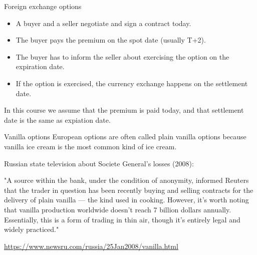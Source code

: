 \documentclass{beamer}
\begin{document}
\begin{frame}{Foreign exchange options}
\justify
\centering
{}
	
\justify
\begin{itemize}
\justifying
\item A buyer and a seller negotiate and sign a contract \alert{today}.
\item The buyer pays the premium on the \alert{spot date} (usually T+2).
\item The buyer has to inform the seller about exercising the option on the \alert{expiration date}.
\item If the option is exercised, the currency exchange happens on the \alert{settlement date}.
\end{itemize}

\justify
In this course we assume that the premium is paid today, and that settlement date is the same as expiation date.
\end{frame}



\begin{frame}{Vanilla options}
\justify
European options are often called \alert{plain vanilla} options because vanilla ice cream is the most common kind of ice cream.

\justify
Russian state television about Societe General's losses (2008):

\justify
"A source within the bank, under the condition of anonymity, informed Reuters that the trader in question has been recently buying and selling contracts for the delivery of plain vanilla ---\alert{ the kind used in cooking}. However, it's worth noting that vanilla production worldwide doesn't reach 7 billion dollars annually. Essentially, this is a form of trading in thin air, though it's entirely legal and widely practiced."

\justify
\url{https://www.newsru.com/russia/25Jan2008/vanilla.html}
\end{frame}
\end{document}
